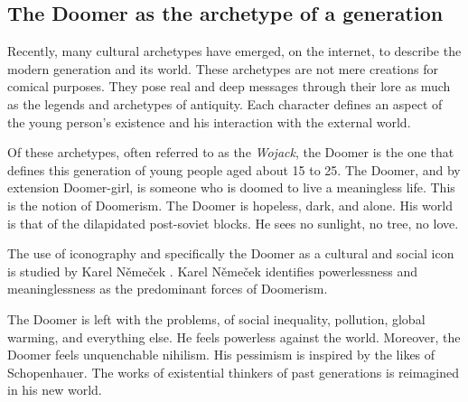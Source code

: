 \documentclass[../report.tex]{subfiles}
\begin{document}
\subsection{The Doomer as the archetype of a generation}

Recently, many cultural archetypes have emerged, on the internet, to describe the modern generation and its world. 
These archetypes are not mere creations for comical purposes.
They pose real and deep messages through their lore as much as the legends and archetypes of antiquity.
Each character defines an aspect of the young person's existence and his interaction with the external world. 

Of these archetypes, often referred to as the \textit{Wojack}, the Doomer is the one that defines this generation of young people aged about 15 to 25.
The Doomer, and by extension Doomer-girl, is someone who is doomed to live a meaningless life.
This is the notion of Doomerism.
The Doomer is hopeless, dark, and alone.
His world is that of the dilapidated post-soviet blocks.
He sees no sunlight, no tree, no love. 

The use of iconography and specifically the Doomer as a cultural and social icon is studied by Karel Němeček \cite{memes_reservoir}. Karel Němeček identifies powerlessness and meaninglessness as the predominant forces of Doomerism. 

The Doomer is left with the problems, of social inequality, pollution, global warming, and everything else.
He feels powerless against the world.
Moreover, the Doomer feels unquenchable nihilism. His pessimism is inspired by the likes of Schopenhauer.
The works of existential thinkers of past generations is reimagined in his new world. 


\end{document}
